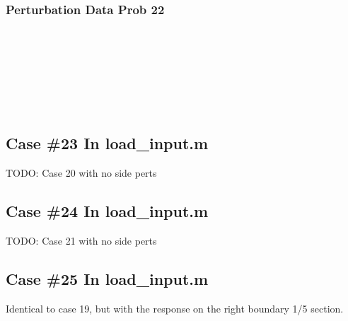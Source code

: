 \documentclass{article}
\begin{document}
\subsubsection{Perturbation Data Prob 22}
\\ \\
\\ \\
\\ \\

\subsection{Case \#23 In load\_input.m}
TODO: Case 20 with no side perts

\subsection{Case \#24 In load\_input.m}
TODO: Case 21 with no side perts

\subsection{Case \#25 In load\_input.m}
Identical to case 19, but with the response on the right boundary 1/5 section.
\end{document}
